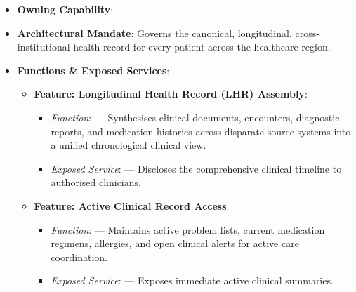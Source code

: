 \begin{itemize}

\item
\textbf{Owning Capability}: \texttt{}



\item
\textbf{Architectural Mandate}: Governs the canonical, longitudinal, cross-institutional health record for every patient across the healthcare region.



\item
\textbf{Functions \& Exposed Services}:


\begin{itemize}

\item
\textbf{Feature: Longitudinal Health Record (LHR) Assembly}:


\begin{itemize}

\item
\emph{Function}: \texttt{} — Synthesises clinical documents, encounters, diagnostic reports, and medication histories across disparate source systems into a unified chronological clinical view.



\item
\emph{Exposed Service}: \texttt{} — Discloses the comprehensive clinical timeline to authorised clinicians.



\end{itemize}


\item
\textbf{Feature: Active Clinical Record Access}:


\begin{itemize}

\item
\emph{Function}: \texttt{} — Maintains active problem lists, current medication regimens, allergies, and open clinical alerts for active care coordination.



\item
\emph{Exposed Service}: \texttt{} — Exposes immediate active clinical summaries.




\end{itemize}
\end{itemize}
\end{itemize}
